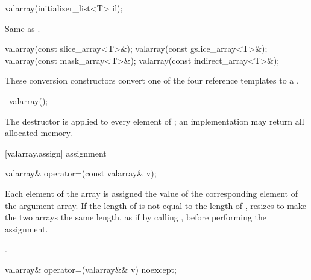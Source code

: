 %
\begin{itemdecl}
valarray(initializer_list<T> il);
\end{itemdecl}

\begin{itemdescr}
\pnum
\effects Same as .
\end{itemdescr}

%
\begin{itemdecl}
valarray(const slice_array<T>&);
valarray(const gslice_array<T>&);
valarray(const mask_array<T>&);
valarray(const indirect_array<T>&);
\end{itemdecl}

\begin{itemdescr}
\pnum
These conversion constructors convert one of the four reference templates
to a
.
\end{itemdescr}

%
\begin{itemdecl}
~valarray();
\end{itemdecl}

\begin{itemdescr}
\pnum
The destructor is applied to every element of
;
an implementation may return all allocated memory.
\end{itemdescr}

[valarray.assign]{ assignment}

%
\begin{itemdecl}
valarray& operator=(const valarray& v);
\end{itemdecl}

\begin{itemdescr}
\pnum
Each element of the
array is assigned the value of the corresponding element of the argument
array.
If the length of  is not equal to the length of 
, resizes  to make the two arrays the same length,
as if by calling , before performing the assignment.

\pnum
\postconditions {}.
\end{itemdescr}

%
\begin{itemdecl}
valarray& operator=(valarray&& v) noexcept;
\end{itemdecl}

